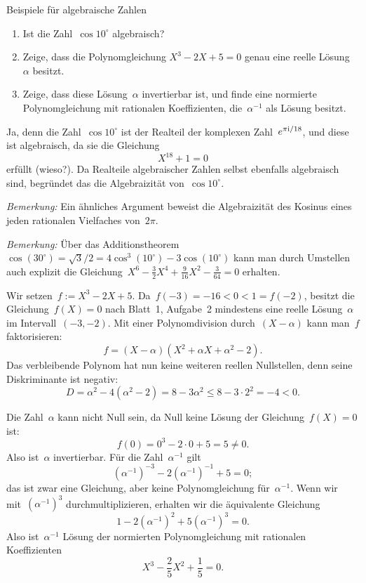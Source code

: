 \documentclass{algblatt}
\begin{document}
\vspace*{-1.5cm}

\begin{aufgabe}{Beispiele für algebraische Zahlen}
\begin{enumerate}
\item Ist die Zahl~$\cos 10^\circ$ algebraisch?
\item Zeige, dass die Polynomgleichung $X^3 - 2X + 5 = 0$ genau eine reelle
Lösung~$\alpha$ besitzt.
\item Zeige, dass diese Lösung~$\alpha$ invertierbar ist, und finde eine normierte
Polynomgleichung mit rationalen Koeffizienten, die~$\alpha^{-1}$ als Lösung besitzt.
\end{enumerate}
\begin{loesungE}
\item Ja, denn die Zahl~$\cos 10^\circ$ ist der Realteil der komplexen
Zahl~$e^{\pi\mathrm{i}/18}$, und diese ist algebraisch, da sie die Gleichung
\[ X^{18} + 1 = 0 \]
erfüllt (wieso?). Da Realteile algebraischer Zahlen selbst ebenfalls
algebraisch sind, begründet das die Algebraizität von~$\cos 10^\circ$.

\emph{Bemerkung:} Ein ähnliches Argument beweist die Algebraizität des Kosinus
eines jeden rationalen Vielfaches von~$2\pi$.

\emph{Bemerkung:} Über das Additionstheorem~$\cos(30^\circ) = \sqrt{3}/2 = 4
\cos^3(10^\circ) - 3\cos(10^\circ)$ kann man durch Umstellen auch explizit die
Gleichung~$X^6-\frac{3}{2}X^4+\frac{9}{16}X^2-\frac{3}{64} = 0$ erhalten.

\item Wir setzen~$f := X^3-2X+5$. Da~$f(-3) =
-16 < 0 < 1 = f(-2)$, besitzt die Gleichung~$f(X) = 0$ nach Blatt~1, Aufgabe~2
mindestens eine reelle Lösung~$\alpha$ im Intervall~$(-3, -2)$. Mit einer Polynomdivision
durch~$(X-\alpha)$ kann man~$f$ faktorisieren:
\[ f = (X - \alpha) (X^2 + \alpha X + \alpha^2-2). \]
Das verbleibende Polynom hat nun keine weiteren reellen Nullstellen, denn seine
Diskriminante ist negativ:
\[ D = \alpha^2 - 4(\alpha^2-2) = 8 - 3 \alpha^2 \leq 8 - 3 \cdot 2^2 = -4 < 0. \]
\item Die Zahl~$\alpha$ kann nicht Null sein, da Null keine Lösung der
Gleichung~$f(X) = 0$ ist:
\[ f(0) = 0^3 - 2 \cdot 0 + 5 = 5 \neq 0. \]
Also ist~$\alpha$ invertierbar. Für die Zahl~$\alpha^{-1}$ gilt
\[ (\alpha^{-1})^{-3} - 2 (\alpha^{-1})^{-1} + 5 = 0; \]
das ist zwar eine Gleichung, aber keine Polynomgleichung für~$\alpha^{-1}$.
Wenn wir mit~$(\alpha^{-1})^3$ durchmultiplizieren, erhalten wir die
äquivalente Gleichung
\[ 1 - 2 (\alpha^{-1})^2 + 5 (\alpha^{-1})^3 = 0. \]
Also ist~$\alpha^{-1}$ Lösung der normierten Polynomgleichung mit rationalen
Koeffizienten
\[ X^3 - \frac{2}{5} X^2 + \frac{1}{5} = 0. \]
\end{loesungE}
\end{aufgabe}
\end{document}
